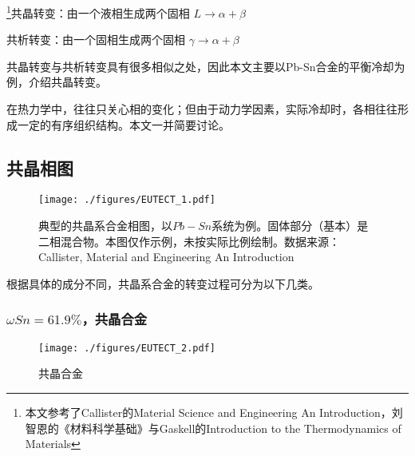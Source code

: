 

\footnote{本文参考了Callister的Material Science and Engineering An Introduction，刘智恩的《材料科学基础》与Gaskell的Introduction to the Thermodynamics of Materials}共晶转变：由一个液相生成两个固相 $L \rightarrow \alpha+\beta$

共析转变：由一个固相生成两个固相 $\gamma \rightarrow \alpha+\beta$

共晶转变与共析转变具有很多相似之处，因此本文主要以Pb-Sn合金的平衡冷却为例，介绍共晶转变。

在热力学中，往往只关心相的变化；但由于动力学因素，实际冷却时，各相往往形成一定的有序组织结构。本文一并简要讨论。

\subsection{共晶相图}
\begin{figure}[ht]
\centering
\texttt{[image: ./figures/EUTECT\_1.pdf]}
\caption{典型的共晶系合金相图，以$Pb-Sn$系统为例。固体部分（基本）是二相混合物。本图仅作示例，未按实际比例绘制。数据来源：Callister, Material and Engineering An Introduction} \label{EUTECT_fig1}
\end{figure}
根据具体的成分不同，共晶系合金的转变过程可分为以下几类。

\subsubsection{$\omega Sn=61.9\%$，共晶合金}
\begin{figure}[ht]
\centering
\texttt{[image: ./figures/EUTECT\_2.pdf]}
\caption{共晶合金} \label{EUTECT_fig2}
\end{figure}


